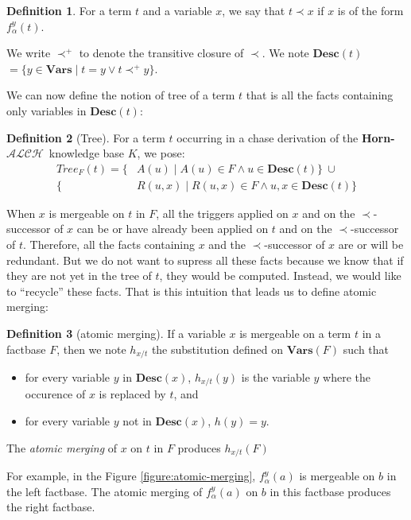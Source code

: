 \documentclass{article}
\theoremstyle{definition}
\newtheorem{definition}{Definition}[section]
\theoremstyle{remark}
\newcommand{\Vars}{\textbf{Vars}}
\newcommand{\Tree}{\textit{Tree}}
\newcommand{\des}{\textbf{Desc}}
\newcommand{\ALCH}{\textbf{Horn-$\mathcal{ALCH}$}}
\begin{document}
\begin{definition}
For a term $t$ and a variable $x$, we say that $t \prec x$ if $x$ is of the form $f_\alpha^y(t)$.

We write $\prec^+$ to denote the transitive closure of $\prec$. We note \emph{$\des(t)$}$= \{y \in \Vars \mid t = y \vee t \prec^+ y\}$.
\end{definition}

We can now define the notion of tree of a term $t$ that is all the facts containing only variables in $\des(t)$:

\begin{definition}[Tree]
For a term $t$ occurring in a chase derivation of the \ALCH\ knowledge base $K$, we pose:
\begin{align*}
	\Tree_{F}(t) = \{&A(u) \mid A(u) \in F \wedge u \in \des(t)\}~\cup \\
	\{&R(u,x) \mid R(u,x) \in F \wedge u,x \in \des(t)\}
\end{align*}
\end{definition}

When $x$ is mergeable on $t$ in $F$, all the triggers applied on $x$ and on the $\prec$-successor of $x$ can be or have already been applied on $t$ and on the $\prec$-successor of $t$. Therefore, all the facts containing $x$ and the $\prec$-successor of $x$ are or will be redundant. But we do not want to supress all these facts because we know that if they are not yet in the tree of $t$, they would be computed. Instead, we would like to ``recycle'' these facts. That is this intuition that leads us to define atomic merging:

\begin{definition}[atomic merging]
If a variable $x$ is mergeable on a term $t$ in a factbase $F$, then we note $h_{x/t}$ the substitution defined on $\Vars(F)$ such that 
\begin{itemize}
\item for every variable $y$ in $\des(x)$, $h_{x/t}(y)$ is the variable $y$ where the occurence of $x$ is replaced by $t$, and 
\item for every variable $y$ not in $\des(x)$, $h(y) = y$. 
\end{itemize}

The \emph{atomic merging} of $x$ on $t$ in $F$ produces $h_{x/t}(F)$ 
\end{definition}

For example, in the Figure \ref{figure:atomic-merging}, $f_\alpha^y(a)$ is mergeable on $b$ in the left factbase. The atomic merging of $f_\alpha^y(a)$ on $b$ in this factbase produces the right factbase.
\end{document}
